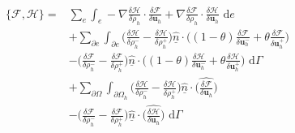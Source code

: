 \documentclass[a4paper,11pt]{article}
\begin{document}
 \begin{equation}
\begin{aligned}
 \{ \mathcal{F},  \mathcal{H}\} = &  \sum_e \int_e - \nabla \frac{\delta  \mathcal{H}}{\delta \rho_h}\cdot \frac{\delta  \mathcal{F}}{\delta \mathbf{u}_h} + \nabla \frac{\delta  \mathcal{F}}{\delta \rho_h}\cdot \frac{\delta  \mathcal{H}}{\delta \mathbf{u}_h} \text{ d}e \\
 &+ \sum_{\partial e} \int_{\partial e } \bigg(  \frac{\delta  \mathcal{H}}{\delta \rho_h^-} -\frac{\delta  \mathcal{H}}{\delta \rho_h^+}\bigg)\hat{\underline{n}} \cdot\bigg ( (1-\theta) \frac{\delta  \mathcal{F}}{\delta  \mathbf{u}_h^-}+ \theta\frac{\delta  \mathcal{F}}{\delta  \mathbf{u}_h^+} \bigg)\\
 & - \bigg(  \frac{\delta  \mathcal{F}}{\delta \rho_h^-} -\frac{\delta  \mathcal{F}}{\delta \rho_h^+}\bigg)\hat{\underline{n}} \cdot\bigg ( (1-\theta) \frac{\delta  \mathcal{H}}{\delta  \mathbf{u}_h^-}+ \theta\frac{\delta  \mathcal{H}}{\delta  \mathbf{u}_h^+} \bigg) \text{ d} \Gamma \\
 &+ \sum_{\partial \Omega} \int_{\partial \Omega_h } \bigg(  \frac{\delta  \mathcal{H}}{\delta \rho_h^-} -\frac{\delta  \mathcal{H}}{\delta \rho_h^+}\bigg)\hat{\underline{n}} \cdot\bigg (   \widehat{\frac{\delta  \mathcal{F}}{\delta  \mathbf{u}_h}} \bigg)\\
 & - \bigg(  \frac{\delta  \mathcal{F}}{\delta \rho_h^-} -\frac{\delta  \mathcal{F}}{\delta \rho_h^+}\bigg)\hat{\underline{n}} \cdot\bigg (   \widehat{\frac{\delta  \mathcal{H}}{\delta  \mathbf{u}_h}} \bigg) \text{ d}  \Gamma
 \end{aligned}
 \end{equation}
 
\end{document}
